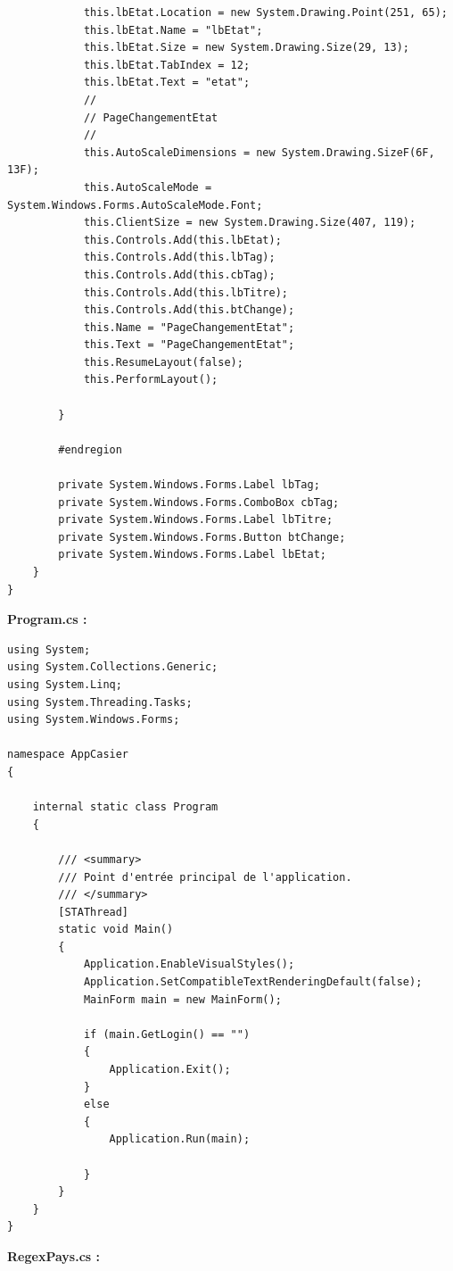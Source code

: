 \documentclass[main.tex]{subfiles}
\begin{document}
\begin{lstlisting}
            this.lbEtat.Location = new System.Drawing.Point(251, 65);
            this.lbEtat.Name = "lbEtat";
            this.lbEtat.Size = new System.Drawing.Size(29, 13);
            this.lbEtat.TabIndex = 12;
            this.lbEtat.Text = "etat";
            // 
            // PageChangementEtat
            // 
            this.AutoScaleDimensions = new System.Drawing.SizeF(6F, 13F);
            this.AutoScaleMode = System.Windows.Forms.AutoScaleMode.Font;
            this.ClientSize = new System.Drawing.Size(407, 119);
            this.Controls.Add(this.lbEtat);
            this.Controls.Add(this.lbTag);
            this.Controls.Add(this.cbTag);
            this.Controls.Add(this.lbTitre);
            this.Controls.Add(this.btChange);
            this.Name = "PageChangementEtat";
            this.Text = "PageChangementEtat";
            this.ResumeLayout(false);
            this.PerformLayout();

        }

        #endregion

        private System.Windows.Forms.Label lbTag;
        private System.Windows.Forms.ComboBox cbTag;
        private System.Windows.Forms.Label lbTitre;
        private System.Windows.Forms.Button btChange;
        private System.Windows.Forms.Label lbEtat;
    }
}
\end{lstlisting}


\textbf{Program.cs :}

\begin{lstlisting}
using System;
using System.Collections.Generic;
using System.Linq;
using System.Threading.Tasks;
using System.Windows.Forms;

namespace AppCasier
{

    internal static class Program
    {

        /// <summary>
        /// Point d'entrée principal de l'application.
        /// </summary>
        [STAThread]
        static void Main()
        {
            Application.EnableVisualStyles();
            Application.SetCompatibleTextRenderingDefault(false);
            MainForm main = new MainForm();

            if (main.GetLogin() == "")
            {
                Application.Exit();
            }
            else
            {
                Application.Run(main);

            }
        }
    }
}
\end{lstlisting}


\textbf{RegexPays.cs :}
\end{document}
